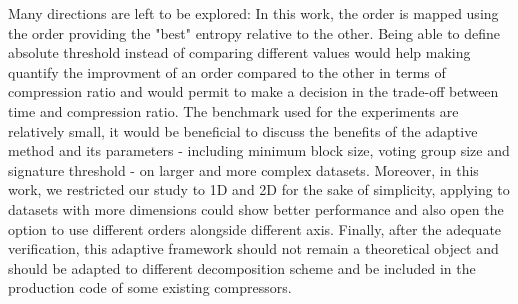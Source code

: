\documentclass[conference]{IEEEtran}
\theoremstyle{remark}
\begin{document}
Many directions are left to be explored:
In this work, the order is mapped using the order providing the "best" entropy relative to the other. Being able to define absolute threshold instead of comparing different values would help making quantify the improvment of an order compared to the other in terms of compression ratio and would permit to make a decision in the trade-off between time and compression ratio.
The benchmark used for the experiments are relatively small, it would be beneficial to discuss the benefits of the adaptive method and its parameters - including minimum block size, voting group size and signature threshold - on larger and more complex datasets.
Moreover, in this work, we restricted our study to 1D and 2D for the sake of simplicity, applying to datasets with more dimensions could show better performance and also open the option to use different orders alongside different axis.
Finally, after the adequate verification, this adaptive framework should not remain a theoretical object and should be adapted to different decomposition scheme and be included in the production code of some existing compressors.



\printbibliography
\end{document}
